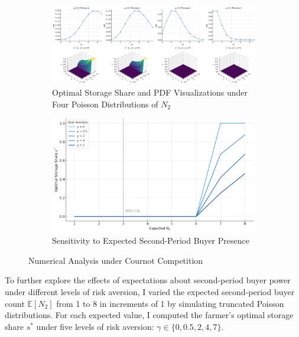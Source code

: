 \begin{figure}[htp]
    \centering
    \begin{subfigure}{\textwidth}
        \centering
        \includegraphics[width=\textwidth, keepaspectratio=true]{model_figures/3D_cournot.png}
        \caption{Optimal Storage Share and PDF Visualizations under Four Poisson Distributions of $N_2$}
        \label{Fig: 3D Cournot}
    \end{subfigure}
    
    \vspace{10mm} %
    
    \begin{subfigure}{\textwidth}
        \centering
        \includegraphics[width=\textwidth, keepaspectratio=true]{model_figures/buyer_count_sensitivity_cournot.png}
        \caption{Sensitivity to Expected Second-Period Buyer Presence}
        \label{Fig: Cournot sensitivity}
    \end{subfigure}

    \caption{Numerical Analysis under Cournot Competition}
\end{figure}

To further explore the effects of expectations about second-period buyer power under different levels of risk aversion, I varied the expected second-period buyer count $\mathbb{E}[N_2]$ from 1 to 8 in increments of 1 by simulating truncated Poisson distributions. For each expected value, I computed the farmer’s optimal storage share $s^*$ under five levels of risk aversion: $\gamma \in \{0, 0.5, 2, 4, 7\}$.

